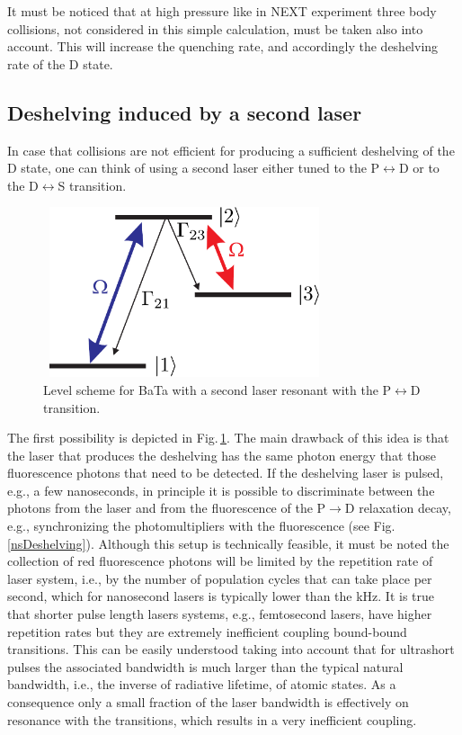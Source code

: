 It must be noticed that at high pressure like in NEXT experiment three body collisions, not considered in this simple calculation, must be taken also into account. This will increase the quenching rate, and accordingly the deshelving rate of the D state. 

\subsection{Deshelving induced by a second laser}

In case that collisions are not efficient for producing a sufficient deshelving of the D state, one can think of using a second laser either tuned to the P$\leftrightarrow$D or to the D$\leftrightarrow$S transition. 

\begin{figure}[ht!]
\includegraphics[width=8.3cm, height=5cm]{imgs/levelscheme3.pdf}
\caption{\label{levelscheme3} Level scheme for BaTa with a second laser resonant with the P$\leftrightarrow$D transition.}
\end{figure}

The first possibility is depicted in Fig.\,\ref{levelscheme3}. The main drawback of this idea is that the laser that produces the deshelving has the same photon energy that those fluorescence photons that need to be detected. If the deshelving laser is pulsed, e.g., a few nanoseconds, in principle it is possible to discriminate between the photons from the laser and from the fluorescence of the P$\rightarrow$D relaxation decay, e.g., synchronizing the photomultipliers with the fluorescence (see Fig.\,\ref{nsDeshelving}). Although this setup is technically feasible, it must be noted the collection of red fluorescence photons will be limited by the repetition rate of  laser system, i.e., by the number of population cycles that can take place per second, which for nanosecond lasers is typically lower than the kHz. It is true that shorter pulse length lasers systems, e.g., femtosecond lasers, have higher repetition rates but they are extremely inefficient coupling bound-bound transitions. This can be easily understood taking into account that for ultrashort pulses the associated bandwidth is much larger than the typical natural bandwidth, i.e., the inverse of radiative lifetime, of atomic states. As a consequence  only a small fraction of the laser bandwidth is effectively on resonance with the transitions, which results in a very inefficient coupling. 


